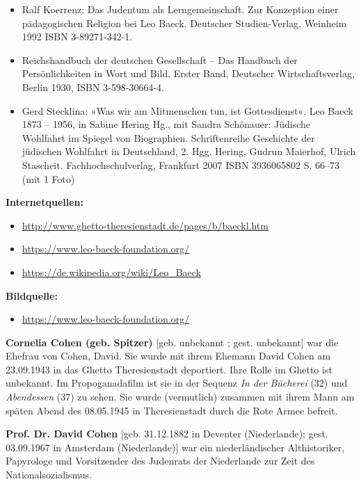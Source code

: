 \documentclass[a4paper]{article}
\begin{document}
\begin{itemize}
Herausgegeben vom Centrum Judaicum. Verlag Hentrich \& Hentrich, Teetz 2009, ISBN 978-3-938485-84-2 (= Jüdische
Miniaturen Band 75).  
\item Ralf Koerrenz: Das Judentum als Lerngemeinschaft. Zur Konzeption einer pädagogischen Religion bei Leo Baeck.
Deutscher Studien-Verlag, Weinheim 1992 ISBN 3-89271-342-1.  
\item Reichshandbuch der deutschen Gesellschaft – Das Handbuch der Persönlichkeiten in Wort und Bild. Erster Band,
Deutscher Wirtschaftsverlag, Berlin 1930, ISBN 3-598-30664-4.  
\item Gerd Stecklina: »Was wir am Mitmenschen tun, ist Gottesdienst«. Leo Baeck 1873 – 1956, in Sabine Hering Hg., mit
Sandra Schönauer: Jüdische Wohlfahrt im Spiegel von Biographien. Schriftenreihe Geschichte der jüdischen Wohlfahrt in
Deutschland, 2. Hgg. Hering, Gudrun Maierhof, Ulrich Stascheit. Fachhochschulverlag, Frankfurt 2007 ISBN 3936065802 S.
66–73 (mit 1 Foto)
\end{itemize}

\bigskip


\bigskip

\textbf{Internetquellen:}

\begin{itemize}
\item \url{http://www.ghetto-theresienstadt.de/pages/b/baeckl.htm}
\item \url{https://www.leo-baeck-foundation.org/} 
\item \url{https://de.wikipedia.org/wiki/Leo_Baeck} 
\end{itemize}

\bigskip

\textbf{Bildquelle:}

\begin{itemize}
\item \url{https://www.leo-baeck-foundation.org/}
\end{itemize}
\textbf{Cornelia Cohen (geb. Spitzer)} [geb. unbekannt ; gest. unbekannt] war die Ehefrau von Cohen, David. Sie wurde
mit ihrem Ehemann David Cohen am 23.09.1943 in das Ghetto Theresienstadt deportiert. Ihre Rolle im Ghetto ist
unbekannt. Im Propoganadafilm ist sie in der Sequenz \textit{In der Bücherei} (32) und \textit{Abendessen} (37) zu
sehen. Sie wurde (vermutlich) zusammen mit ihrem Mann am späten Abend des 08.05.1945 in Theresienstadt durch die Rote
Armee befreit. 


\bigskip

\textbf{Prof. Dr. David Cohen} [geb. 31.12.1882 in Deventer (Niederlande); gest. 03.09.1967 in Amsterdam (Niederlande)]
war ein niederländischer Althistoriker, Papyrologe und Vorsitzender des Judenrats der Niederlande zur Zeit des
Nationalsozialismus.
\end{document}
